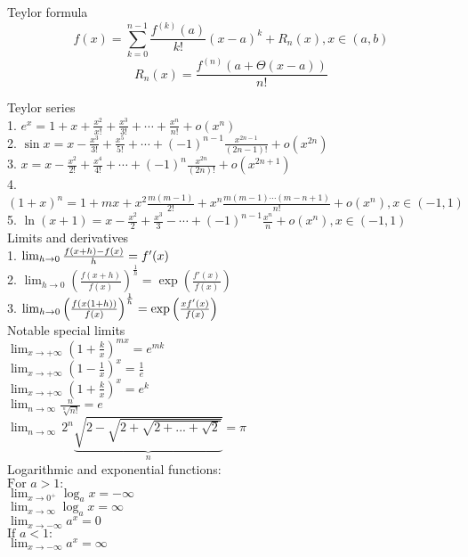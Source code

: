 \documentclass{letter}
\begin{document}
Teylor formula \\
$$
f(x) = \sum_{k = 0}^{n - 1} \frac{f^{(k)} (a)}{k!} (x - a)^k + R_n(x), x \in (a, b)
$$
$$
R_n(x) = \frac{f^{(n)}(a + \Theta(x - a))}{n!} 
$$

Teylor series \\
1. $e^x = 1 + x + \frac{x^2}{x!} + \frac{x^3}{3!} + \cdots + \frac{x^n}{n!} + o(x^n) $ \\
2. $ \sin{x} = x - \frac{x^3}{3!} + \frac{x^5}{5!} + \cdots + (-1)^{n-1}\frac{x^{2n-1}}{(2n-1)!} + o(x^{2n}) $ \\
3. $ x = x - \frac{x^2}{2!} + \frac{x^4}{4!} + \cdots + (-1)^n\frac{x^{2n}}{(2n)!} + o(x^{2n+1}) $ \\
4. $ (1+x)^n = 1 + mx + x^2\frac{m(m-1)}{2!} + x^n\frac{m(m-1)\cdots(m-n+1)}{n!} + o(x^n), x \in (-1,1) $ \\
5. $ \ln(x + 1) = x - \frac{x^2}{2} + \frac{x^3}{3} - \cdots + (-1)^{n-1}\frac{x^n}{n} + o(x^n), x \in (-1,1) $ \\

Limits and derivatives \\
1. $\lim_{h\to 0}{f(x+h)-f(x)\over h}=f'(x)$ \\
2. $\lim_{h\to0}\left(\frac{f(x+h)}{f(x)}\right)^\frac{1}{h}=\exp\left(\frac{f'(x)}{f(x)}\right)$ \\
3. $\lim_{h \to 0}{ \left({f(x(1+h))\over{f(x)}}\right)^{1\over{h}} }=\exp\left(\frac{x f'(x)}{f(x)}\right)$ \\

Notable special limits \\
$\lim_{x\to+\infty} \left(1+\frac{k}{x}\right)^{mx}=e^{mk} $ \\
$\lim_{x\to+\infty} \left(1-\frac{1}{x}\right)^x=\frac{1}{e} $ \\
$\lim_{x\to+\infty} \left(1+\frac{k}{x}\right)^x=e^k $ \\
$\lim_{n\to\infty} \frac{n}{\sqrt[n]{n!}}=e $ \\
$\lim_{n\to \infty }\, 2^{n} \underbrace{\sqrt{2-\sqrt{2+\sqrt{2+\text{...} +\sqrt{2}}}}}_n= \pi $ \\

Logarithmic and exponential functions: \\
$\mbox{For } a > 1: \, $ \\
$\lim_{x \to 0^+} \log_a x = -\infty$ \\
$\lim_{x \to \infty} \log_a x = \infty$ \\
$\lim_{x \to -\infty} a^x = 0 $ \\
$\mbox{If } a < 1: \, $ \\
$\lim_{x \to -\infty} a^x = \infty $ \\
\end{document}
